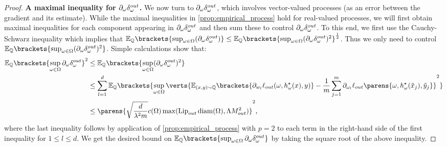 \begin{proof}
{\bf A maximal inequality for $\partial_{\omega}\delta_\omega^{out}$.}
{We now turn to  $\partial_{\omega}\delta_\omega^{out}$, which involves vector-valued processes (as an error between the gradient and its estimate).} While the maximal inequalities in \cref{prop:empirical_process} hold for real-valued processes, we will first obtain maximal inequalities for each component appearing in $\partial_{\omega}\delta_\omega^{out}$ and then sum these to control $\partial_{\omega}\delta_\omega^{out}$.
To this end, we first use the Cauchy-Schwarz inequality which implies that $\mathbb{E}_{\mathbb{Q}}\brackets{\sup_{\omega\in \Omega} (\Doutw) }\leq \mathbb{E}_{\mathbb{Q}}\brackets{\sup_{\omega\in \Omega} (\Doutw)^2 }^{\frac{1}{2}}$. Thus we only need to control $\mathbb{E}_{\mathbb{Q}}\brackets{\sup_{\omega\in \Omega} (\Doutw)^2 }$. Simple calculations show that:
\begin{align*}
	\mathbb{E}_{\mathbb{Q}}\brackets{\sup_{\omega\in \Omega} \Doutw }^2&\leq \mathbb{E}_{\mathbb{Q}}\brackets{\sup_{\omega\in \Omega} (\Doutw)^2 }\\
	&\leq  \sum_{l=1}^d \mathbb{E}_{\mathbb{Q}}\brackets{\sup_{\omega\in \Omega}\verts{\mathbb{E}_{(x,y)\sim\mathbb{Q}}\brackets{\partial_{w_l}\ell_{out}(\omega,h_{\omega}^{\star}(x),y)} - \frac{1}{m}\sum_{j=1}^m \partial_{\omega_l}\ell_{out}\parens{\omega,h_{\omega}^{\star}(\tilde{x}_j),\tilde{y}_j}  }^2}\\
	&\leq \parens{\sqrt{\frac{d}{\lambda^2m}}c(\Omega)\max(\lipout\diam(\Omega),\Lambda M_{out}^{{2}})}^2,
\end{align*}
where the last inequality follows by application of \cref{prop:empirical_process} with $p=2$ to each term in the right-hand side of the first inequality for $1\leq l\leq d$. We get the desired bound on  $\mathbb{E}_{\mathbb{Q}}\brackets{\sup_{\omega\in \Omega} \Doutw }$ by taking the square root of the above inequality.
\end{proof}

